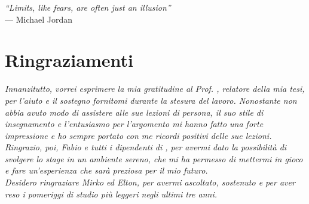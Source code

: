 
\cleardoublepage
{}
{}

\begin{flushright}{
		\slshape
		``Limits, like fears, are often just an illusion''} \\
	\medskip
	--- Michael Jordan
\end{flushright}

\bigskip

\begingroup
\let\clearpage\relax
\let\cleardoublepage\relax
\let\cleardoublepage\relax

\chapter*{Ringraziamenti}


\noindent \textit{Innanzitutto, vorrei esprimere la mia gratitudine al Prof.
	\myProf, relatore della mia tesi, per l'aiuto e il sostegno fornitomi
	durante
	la stesura del lavoro. Nonostante non abbia avuto modo di assistere
	alle sue
	lezioni di persona, il suo stile di insegnamento e l'entusiasmo per
	l'argomento
	mi hanno fatto una forte impressione e ho sempre portato con me ricordi
	positivi delle sue lezioni.}\\


\noindent \textit{Ringrazio, poi, Fabio e tutti i dipendenti di \myCompany, per
	avermi dato la possibilità di svolgere lo stage in un ambiente sereno,
	che		 mi ha permesso di mettermi in gioco e fare un'esperienza che
	sarà preziosa		   per il mio futuro.}\\

\noindent \textit{Desidero ringraziare Mirko ed Elton, per avermi ascoltato,
	sostenuto e per aver reso i pomeriggi di studio più leggeri negli
	ultimi tre
	anni.}\\

